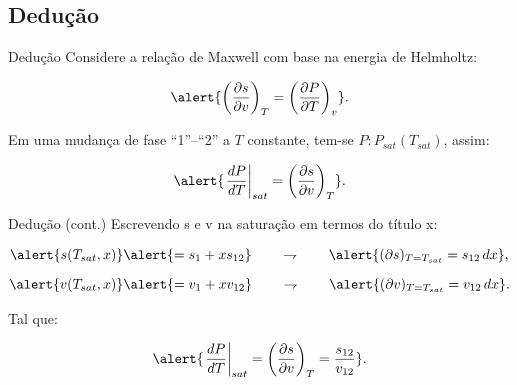 \subsection{Dedução}

    \begin{frame}{Dedução}\vspace*{-1em}
        Considere a \alert{relação de Maxwell} com base na \alert{energia de Helmholtz}:

        \begin{equation*}
            \alert{
                \left(\frac{\partial s}{\partial v}\right)_T =
                \left(\frac{\partial P}{\partial T}\right)_v
            }.
        \end{equation*}\vspace*{\medskipamount}

        Em uma \alert{mudança de fase} ``1''--``2'' a $T$ constante, tem-se
        \alert{$P\!:\!P_{sat}(T_{sat})$}, assim:

        \begin{equation*}
            \alert{
                \left.\frac{dP}{dT}\right|_{sat} =
                \left(\frac{\partial s}{\partial v}\right)_T
            }.
        \end{equation*}
    \end{frame}

    \begin{frame}{Dedução (cont.)}\vspace*{-1em}
        Escrevendo \alert{s} e \alert{v} na saturação em termos do título \alert{x}:

        \begin{align*}
            \alert{s(T_{sat}, x)}   &\alert{= s_1 + xs_{12}}
            \qquad\rightharpoondown\qquad
            \alert{(\partial s)_{T=T_{sat}} = s_{12}\,dx},
            \\[\medskipamount]
            \alert{v(T_{sat}, x)}   &\alert{= v_1 + xv_{12}}
            \qquad\rightharpoondown\qquad
            \alert{(\partial v)_{T=T_{sat}} = v_{12}\,dx}.
        \end{align*}

        Tal que:

        \begin{equation*}
            \alert{
                \left.\frac{dP}{dT}\right|_{sat} =
                \left(\frac{\partial s}{\partial v}\right)_T =
                \frac{s_{12}}{v_{12}}
            }.
        \end{equation*}
    \end{frame}

